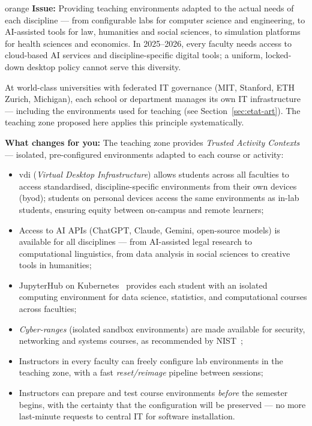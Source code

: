 \bigskip

\begin{stakeholderbox}{orange}
\textbf{Issue:} Providing teaching environments adapted to the
actual needs of each discipline --- from configurable labs for
computer science and engineering, to AI-assisted tools for law,
humanities and social sciences, to simulation platforms for
health sciences and economics. In 2025--2026, every faculty
needs access to cloud-based AI services and discipline-specific
digital tools; a uniform, locked-down desktop policy cannot
serve this diversity.

\medskip
At world-class universities with federated IT governance (MIT,
Stanford, ETH Zurich, Michigan), each school or department manages
its own IT infrastructure --- including the environments used for
teaching (see Section~\ref{sec:etat-art}). The teaching zone
proposed here applies this principle systematically.

\medskip
\textbf{What changes for you:}
The teaching zone provides \emph{Trusted Activity Contexts} ---
isolated, pre-configured environments adapted to each course or
activity:
\begin{itemize}[nosep]
    \item \gls{vdi} (\emph{Virtual Desktop Infrastructure}) allows
    students across all faculties to access standardised,
    discipline-specific environments from their
    own devices (\gls{byod}); students on personal devices access
    the same environments as in-lab students, ensuring equity
    between on-campus and remote learners;
    \item Access to AI APIs (ChatGPT, Claude, Gemini, open-source
    models) is available for all disciplines --- from
    AI-assisted legal research to computational linguistics,
    from data analysis in social sciences to creative tools
    in humanities;
    \item JupyterHub on Kubernetes~\cite{z2jh} provides each student
    with an isolated computing environment for data science,
    statistics, and computational courses across faculties;
    \item \emph{Cyber-ranges} (isolated sandbox environments) are
    made available for security, networking and systems courses,
    as recommended by NIST~\cite{nist-cyberrange};
    \item Instructors in every faculty can freely configure
    lab environments in the teaching zone, with a fast
    \emph{reset/reimage} pipeline between sessions;
    \item Instructors can prepare and test course environments
    \emph{before} the semester begins, with the certainty that
    the configuration will be preserved --- no more last-minute
    requests to central IT for software installation.
\end{itemize}
\end{stakeholderbox}

